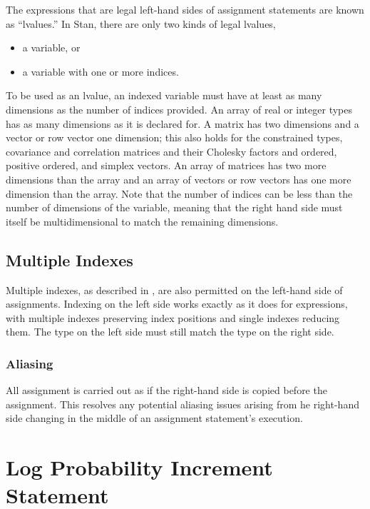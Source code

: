 The expressions that are legal left-hand sides of assignment
statements are known as ``lvalues.''  In Stan, there are only two
kinds of legal lvalues,
%
\begin{itemize}
\item a variable, or
\item a variable with one or more indices.
\end{itemize}
%
To be used as an lvalue, an indexed variable must have at least as
many dimensions as the number of indices provided.  An array of real
or integer types has as many dimensions as it is declared for.  A
matrix has two dimensions and a vector or row vector one dimension;
this also holds for the constrained types, covariance and correlation
matrices and their Cholesky factors and ordered, positive ordered, and
simplex vectors.  An array of matrices has two more dimensions than
the array and an array of vectors or row vectors has one more
dimension than the array.  Note that the number of indices can be less
than the number of dimensions of the variable, meaning that the right
hand side must itself be multidimensional to match the remaining
dimensions.

\subsection{Multiple Indexes}

Multiple indexes, as described in
, are also permitted on the
left-hand side of assignments.  Indexing on the left side works
exactly as it does for expressions, with multiple indexes preserving
index positions and single indexes reducing them.    The type on the
left side must still match the type on the right side.

\subsubsection{Aliasing}

All assignment is carried out as if the right-hand side is copied
before the assignment.  This resolves any potential aliasing issues
arising from he right-hand side changing in the middle of an
assignment statement's execution.



\section{Log Probability Increment Statement}\label{increment-log-prob.section}

